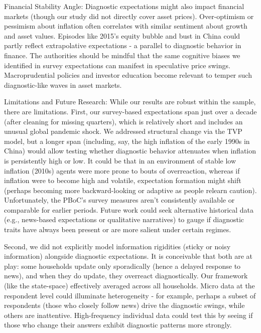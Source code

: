 \documentclass[12pt]{article}
\begin{document}
Financial Stability Angle: Diagnostic expectations might also impact financial markets (though our study did not directly cover asset prices). Over-optimism or pessimism about inflation often correlates with similar sentiment about growth and asset values. Episodes like 2015's equity bubble and bust in China could partly reflect extrapolative expectations - a parallel to diagnostic behavior in finance. The authorities should be mindful that the same cognitive biases we identified in survey expectations can manifest in speculative price swings. Macroprudential policies and investor education become relevant to temper such diagnostic-like waves in asset markets.

Limitations and Future Research: While our results are robust within the sample, there are limitations. First, our survey-based expectations span just over a decade (after cleaning for missing quarters), which is relatively short and includes an unusual global pandemic shock. We addressed structural change via the TVP model, but a longer span (including, say, the high inflation of the early 1990s in China) would allow testing whether diagnostic behavior attenuates when inflation is persistently high or low. It could be that in an environment of stable low inflation (2010s) agents were more prone to bouts of overreaction, whereas if inflation were to become high and volatile, expectation formation might shift (perhaps becoming more backward-looking or adaptive as people relearn caution). Unfortunately, the PBoC's survey measures aren't consistently available or comparable for earlier periods. Future work could seek alternative historical data (e.g., news-based expectations or qualitative narratives) to gauge if diagnostic traits have always been present or are more salient under certain regimes.

Second, we did not explicitly model information rigidities (sticky or noisy information) alongside diagnostic expectations. It is conceivable that both are at play: some households update only sporadically (hence a delayed response to news), and when they do update, they overreact diagnostically. Our framework (like the state-space) effectively averaged across all households. Micro data at the respondent level could illuminate heterogeneity - for example, perhaps a subset of respondents (those who closely follow news) drive the diagnostic swings, while others are inattentive. High-frequency individual data could test this by seeing if those who change their answers exhibit diagnostic patterns more strongly.
\end{document}
